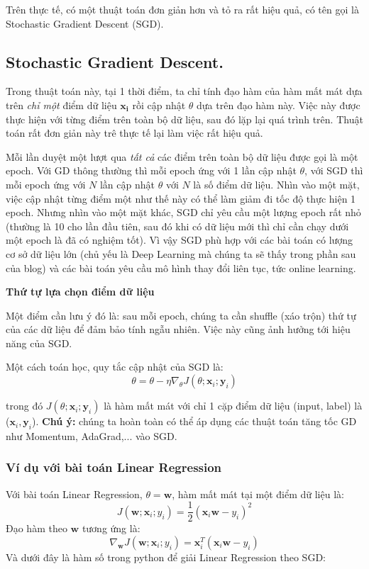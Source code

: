 Trên thực tế, có một thuật toán đơn giản hơn và tỏ ra rất hiệu quả, có tên gọi là Stochastic Gradient Descent (SGD). 
 
\subsection{Stochastic Gradient Descent.}
Trong thuật toán này, tại 1 thời điểm, ta chỉ tính đạo hàm của hàm mất mát dựa trên \textit{chỉ một} điểm dữ liệu $\mathbf{x_i}$ rồi cập nhật $\theta$ dựa trên đạo hàm này. Việc này được thực hiện với từng điểm trên toàn bộ dữ liệu, sau đó lặp lại quá trình trên. Thuật toán rất đơn giản này trê thực tế lại làm việc rất hiệu quả.  
 
Mỗi lần duyệt một lượt qua \textit{tất cả} các điểm trên toàn bộ dữ liệu được gọi là một epoch. Với GD thông thường thì mỗi epoch ứng với 1 lần cập nhật $\theta$, với SGD thì mỗi epoch ứng với $N$ lần cập nhật $\theta$ với $N$ là số điểm dữ liệu. Nhìn vào một mặt, việc cập nhật từng điểm một như thế này có thể làm giảm đi tốc độ thực hiện 1 epoch. Nhưng nhìn vào một mặt khác, SGD chỉ yêu cầu một lượng epoch rất nhỏ (thường là 10 cho lần đầu tiên, sau đó khi có dữ liệu mới thì chỉ cần chạy dưới một epoch là đã có nghiệm tốt). Vì vậy SGD phù hợp với các bài toán có lượng cơ sở dữ liệu lớn (chủ yếu là Deep Learning mà chúng ta sẽ thấy trong phần sau của blog) và các bài toán yêu cầu mô hình thay đổi liên tục, tức online learning. 
 
\textbf{Thứ tự lựa chọn điểm dữ liệu} 
 
Một điểm cần lưu ý đó là: sau mỗi epoch, chúng ta cần shuffle (xáo trộn) thứ tự của các dữ liệu để đảm bảo tính ngẫu nhiên. Việc này cũng ảnh hưởng tới hiệu năng của SGD.  
 
 
Một cách toán học, quy tắc cập nhật của SGD là: 
\begin{equation} 
\theta = \theta - \eta \nabla_{\theta} J(\theta; \mathbf{x}_i; \mathbf{y}_i) 
\end{equation} 
 
trong đó $J(\theta; \mathbf{x}_i; \mathbf{y}_i)$ là hàm mất mát với chỉ 1 cặp điểm dữ liệu (input, label) là ($\mathbf{x}_i, \mathbf{y}_i$). \textbf{Chú ý:} chúng ta hoàn toàn có thể áp dụng các thuật toán tăng tốc GD như Momentum, AdaGrad,... vào SGD. 
 
 
\subsubsection{Ví dụ với bài toán Linear Regression}
Với bài toán Linear Regression, $\theta = \mathbf{w}$, hàm mất mát tại một điểm dữ liệu là: 
\begin{equation} 
J(\mathbf{w}; \mathbf{x}_i; y_i) = \frac{1}{2}(\mathbf{x}_i \mathbf{w} - y_i)^2 
\end{equation} 
Đạo hàm theo $\mathbf{w}$ tương ứng là: 
\begin{equation} 
\nabla_{\mathbf{w}}J(\mathbf{w}; \mathbf{x}_i; y_i) = \mathbf{x}_i^T(\mathbf{x}_i \mathbf{w} - y_i) 
\end{equation} 
Và dưới đây là hàm số trong python để giải Linear Regression theo SGD: 
 
